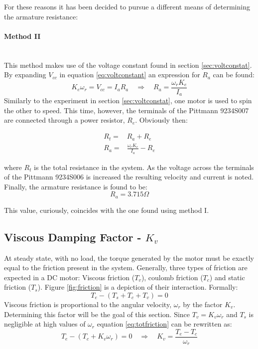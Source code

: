 For these reasons it has been decided to pursue a different means of determining the armature resistance:
\paragraph{Method II}~\\
This method makes use of the voltage constant found in section \ref{sec:voltconstat}.
By expanding $V_{cc}$ in equation \ref{eq:voltconstant} an expression for $R_a$ can be found:
\begin{equation}
	\label{eq:voltconstantexpanded}
	K_e\omega_r = V_{cc} = I_aR_a\quad \Rightarrow \quad R_a = \frac{\omega_rK_e}{I_a}
\end{equation}
Similarly to the experiment in section \ref{sec:voltconstat}, one motor is used to spin the other to speed.
This time, however, the terminals of the Pittmann 9234S007 are connected through a power resistor, $R_e$.
Obviously then:

\begin{eqnarray}
	R_t =& R_a + R_e\\
	R_a =& \frac{\omega_rK_e}{I_a}-R_e
\end{eqnarray}

where $R_t$ is the total resistance in the system.
As the voltage across the terminals of the Pittmann 9234S006 is increased the resulting velocity and current is noted.
Finally, the armature resistance is found to be:
$$R_a = 3.715\Omega$$

This value, curiously, coincides with the one found using method I.

\subsection{Viscous Damping Factor - $K_v$}
\label{sec:viscous}
At steady state, with no load, the torque generated by the motor must be exactly equal to the friction present in the system.
Generally, three types of friction are expected in a DC motor: Viscous friction ($T_v$), coulomb friction ($T_c$) and static friction ($T_s$).
Figure \ref{fig:friction} is a depiction of their interaction.
Formally:
\begin{equation}
	\label{eq:totfriction}
	T_e-(T_s+T_c+T_v)=0
\end{equation}
Viscous friction is proportional to the angular velocity, $\omega_r$ by the factor $K_v$.
Determining this factor will be the goal of this section.
Since $T_v=K_v\omega_r$ and $T_s$ is negligible at high values of $\omega_r$ equation \ref{eq:totfriction} can be rewritten as:
\begin{equation}
	\label{eq:frictionnostatic}
	T_e-(T_c+K_v\omega_r)=0 \quad \Rightarrow \quad K_v = \frac{T_e-T_c}{\omega_r}
\end{equation}


